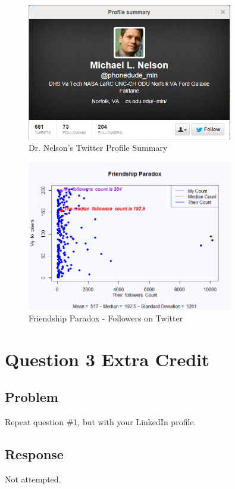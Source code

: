 \documentclass[letterpaper,11pt]{report}
\begin{document}
\begin{savenotes}
\begin{figure}[htbp]
	\centering
		\includegraphics[width=0.80\textwidth]{phonedudeProfileSummary.png}
	\caption{Dr. Nelson's Twitter Profile Summary}
	\label{fig:phonedude}
\end{figure}

\begin{figure}[htbp]
	\centering
		\includegraphics[width=0.80\textwidth]{followersParadox.png}
	\caption{Friendship Paradox - Followers on Twitter}
	\label{fig:followerParadox}
\end{figure}

\section{Question 3 Extra Credit}
\subsection{Problem}Repeat question \#1, but with your LinkedIn profile.
\subsection{Response}Not attempted.


\end{savenotes}
\end{document}
